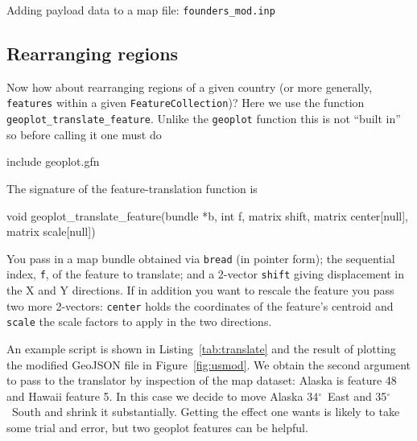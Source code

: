 \documentclass{article}
\renewcommand{\deg}{$^{\circ}$}
\begin{document}
\begin{script}[p]
  \caption{Adding payload data to a map file:
    \texttt{founders\_mod.inp}}
  \label{tab:add-gdp}
\end{script}

\subsection{Rearranging regions}
\label{sec:rearrange}

Now how about rearranging regions of a given country (or more
generally, \texttt{features} within a given
\texttt{FeatureCollection})? Here we use the function
\texttt{geoplot\_translate\_feature}. Unlike the \texttt{geoplot}
function this is not ``built in'' so before calling it one must do
\begin{code}
include geoplot.gfn
\end{code}
The signature of the feature-translation function is
\begin{code}
void geoplot_translate_feature(bundle *b, int f,
                               matrix shift,
                               matrix center[null],
                               matrix scale[null])
\end{code}
You pass in a map bundle obtained via \texttt{bread} (in pointer
form); the sequential index, \texttt{f}, of the feature to translate;
and a 2-vector \texttt{shift} giving displacement in the X and Y
directions. If in addition you want to rescale the feature you pass
two more 2-vectors: \texttt{center} holds the coordinates of the
feature's centroid and \texttt{scale} the scale factors to apply in
the two directions.

An example script is shown in Listing~\ref{tab:translate} and the
result of plotting the modified GeoJSON file in
Figure~\ref{fig:usmod}. We obtain the second argument to pass to the
translator by inspection of the map dataset: Alaska is feature 48 and
Hawaii feature 5. In this case we decide to move Alaska 34\deg\
East and 35\deg\ South and shrink it substantially.  Getting the
effect one wants is likely to take some trial and error, but two
\textsf{geoplot} features can be helpful.
\end{document}
